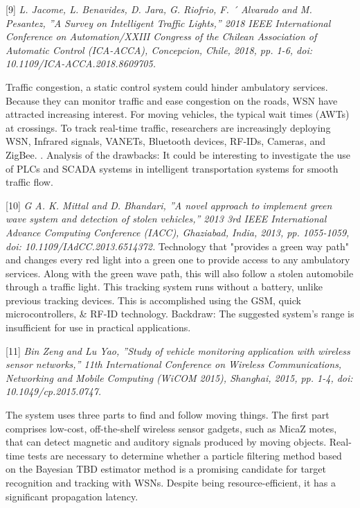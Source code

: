 \documentclass[conference]{IEEEtran}
\begin{document}
[9]\emph{ L. Jacome, L. Benavides, D. Jara, G. Riofrio, F. ´
Alvarado and M. Pesantez, ”A Survey on Intelligent Traffic
Lights,” 2018 IEEE International Conference on Automation/XXIII Congress of the Chilean Association of Automatic
Control (ICA-ACCA), Concepcion, Chile, 2018, pp. 1-6, doi:
10.1109/ICA-ACCA.2018.8609705. }

Traffic congestion, a static control system could hinder ambulatory services. Because they can monitor traffic and ease congestion on the roads, WSN have attracted increasing interest. For moving vehicles, the typical wait times (AWTs) at crossings. To track real-time traffic, researchers are increasingly deploying WSN, Infrared signals, VANETs, Bluetooth devices,  RF-IDs, Cameras, and ZigBee. .
Analysis of the drawbacks: It could be interesting to investigate the use of PLCs and SCADA systems in intelligent transportation systems for smooth traffic flow.

 [10]\emph{  G A. K. Mittal and D. Bhandari, ”A novel approach
to implement green wave system and detection of stolen
vehicles,” 2013 3rd IEEE International Advance Computing
Conference (IACC), Ghaziabad, India, 2013, pp. 1055-1059,
doi: 10.1109/IAdCC.2013.6514372. }
Technology that "provides a green way path" and changes every red light into a green one to provide access to any ambulatory services. Along with the green wave path, this will also follow a stolen automobile through a traffic light. This tracking system runs without a battery, unlike previous tracking devices. This is accomplished using the GSM, quick microcontrollers, & RF-ID technology.
Backdraw: The suggested system's range is insufficient for use in practical applications.

[11]\emph{ Bin Zeng and Lu Yao, ”Study of vehicle monitoring
application with wireless sensor networks,” 11th International
Conference on Wireless Communications, Networking and
Mobile Computing (WiCOM 2015), Shanghai, 2015, pp. 1-4,
doi: 10.1049/cp.2015.0747.
}

The system uses three parts to find and follow moving things. The first part comprises low-cost, off-the-shelf wireless sensor gadgets, such as MicaZ motes, that can detect magnetic and auditory signals produced by moving objects. Real-time tests are necessary to determine whether a particle filtering method based on the Bayesian TBD estimator method is a promising candidate for target recognition and tracking with WSNs. Despite being resource-efficient, it has a significant propagation latency.
\end{document}
